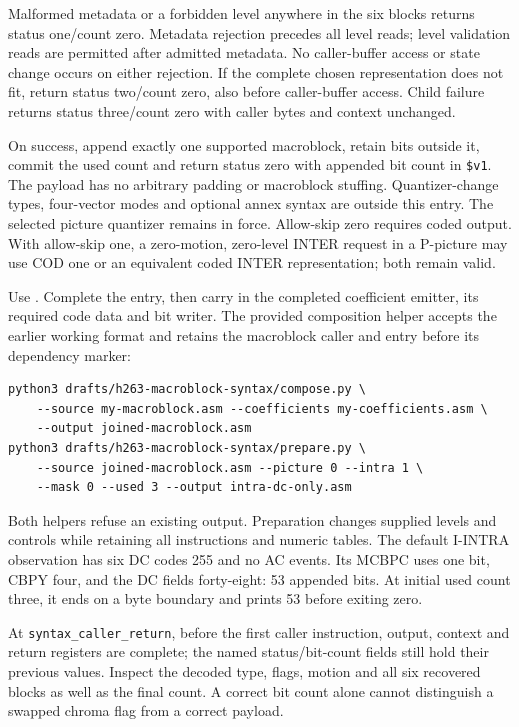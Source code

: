 Malformed metadata or a forbidden level anywhere in the six blocks returns status
one/count zero. Metadata rejection precedes all level reads; level validation
reads are permitted after admitted metadata. No caller-buffer access or state
change occurs on either rejection. If the complete chosen representation does not
fit, return status two/count zero, also before caller-buffer access. Child failure
returns status three/count zero with caller bytes and context unchanged.

On success, append exactly one supported macroblock, retain bits outside it, commit
the used count and return status zero with appended bit count in \texttt{\$v1}.
The payload has no arbitrary padding or macroblock stuffing. Quantizer-change types,
four-vector modes and optional annex syntax are outside this entry. The selected
picture quantizer remains in force. Allow-skip zero requires coded output. With
allow-skip one, a zero-motion, zero-level INTER request in a P-picture may use
COD one or an equivalent coded INTER representation; both remain valid.

Use . Complete the entry, then carry
in the completed coefficient emitter, its required code data and bit writer.
The provided composition helper accepts the earlier working format and retains
the macroblock caller and entry before its dependency marker:
\begin{verbatim}
python3 drafts/h263-macroblock-syntax/compose.py \
    --source my-macroblock.asm --coefficients my-coefficients.asm \
    --output joined-macroblock.asm
python3 drafts/h263-macroblock-syntax/prepare.py \
    --source joined-macroblock.asm --picture 0 --intra 1 \
    --mask 0 --used 3 --output intra-dc-only.asm
\end{verbatim}
Both helpers refuse an existing output. Preparation changes supplied levels and
controls while retaining all instructions and numeric tables. The default I-INTRA
observation has six DC codes 255 and no AC events. Its MCBPC uses one bit, CBPY
four, and the DC fields forty-eight: 53 appended bits. At initial used count
three, it ends on a byte boundary and prints 53 before exiting zero.

At \texttt{syntax\_caller\_return}, before the first caller instruction, output,
context and return registers are complete; the named status/bit-count fields
still hold their previous values. Inspect the decoded type, flags, motion and
all six recovered blocks as well as the final count. A correct bit count alone
cannot distinguish a swapped chroma flag from a correct payload.
